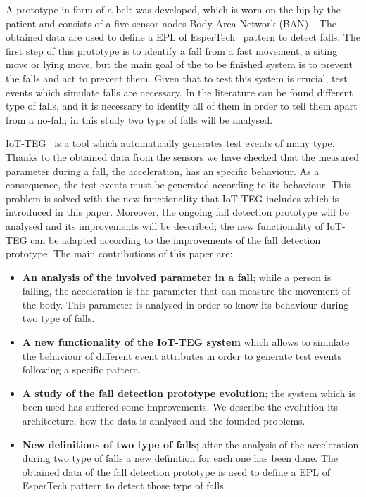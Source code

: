 \documentclass[conference]{IEEEtran}
\theoremstyle{definition}
\begin{document}
A prototype in form of a belt was developed, which is worn on the hip by the patient and consists 
of a five sensor nodes Body Area Network (BAN)~\cite{LaBlunda.2016,LaBlunda.2016b}. The obtained data are used to define a EPL of 
EsperTech~\cite{Esper:2016} pattern to detect falls. The first step of this prototype is to identify a fall from a fast movement, a siting
move or lying move, but the main goal of the to be finished system is to prevent the falls and act to prevent them. Given that to test 
this system is crucial, test events which simulate falls are necessary. In the literature can be found different type of falls, and it is
necessary to identify all of them in order to tell them apart from a no-fall; in this
study two type of falls will be analysed. 

IoT-TEG~\cite{TesisGutierrez2017,Gutierrez2017} is a tool which 
automatically generates test events of many type. Thanks to the obtained data from the sensors we have checked that the measured 
parameter during a fall, the acceleration, has an specific behaviour. As a consequence, the test events must be generated according to 
its behaviour. This problem is solved with the new functionality that IoT-TEG includes which is introduced in this paper. 
Moreover, the ongoing fall detection prototype will be analysed and its improvements will be described; the new functionality of 
IoT-TEG can be adapted according to the improvements of the fall detection prototype. The main contributions of this paper are:

\begin{itemize}
 \item \textbf{An analysis of the involved parameter in a fall}; while a person is falling, the acceleration is the parameter that can
 measure the movement of the body. This parameter is analysed in order to know its behaviour during two type of falls.
 \item \textbf{A new functionality of the IoT-TEG system} which allows to simulate the behaviour of different event attributes in order 
 to generate test events following a specific pattern.
 \item \textbf{A study of the fall detection prototype evolution}; the system which is been used has suffered some improvements. 
 We describe the evolution its architecture, how the data is analysed and the founded problems.
 \item \textbf{New definitions of two type of falls}; after the analysis of the acceleration during two type of falls a new definition
 for each one has been done. The obtained data of the fall detection prototype is used to define a EPL of EsperTech pattern to detect 
 those type of falls. 
\end{itemize}
\end{document}
